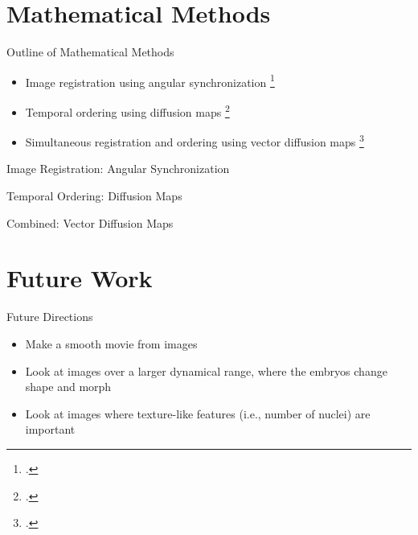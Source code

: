 \documentclass[10pt]{beamer}
\begin{document}
\section{Mathematical Methods}

\begin{frame}{Outline of Mathematical Methods}

\begin{itemize}

\item Image registration using angular synchronization \footcite{singer2011angular}

\item Temporal ordering using diffusion maps \footcite{coifman2005geometric}

\item Simultaneous registration and ordering using vector diffusion maps \footcite{singer2012vector}

\end{itemize}
\end{frame}

\begin{frame}{Image Registration: Angular Synchronization}

\end{frame}

\begin{frame}{Temporal Ordering: Diffusion Maps}

\end{frame}

\begin{frame}{Combined: Vector Diffusion Maps}

\end{frame}

\section{Future Work}

\begin{frame}{Future Directions}

\begin{itemize}
\item Make a smooth movie from images
\item Look at images over a larger dynamical range, where the embryos change shape and morph
\item Look at images where texture-like features (i.e., number of nuclei) are important
\end{itemize}
\end{frame}
\end{document}
